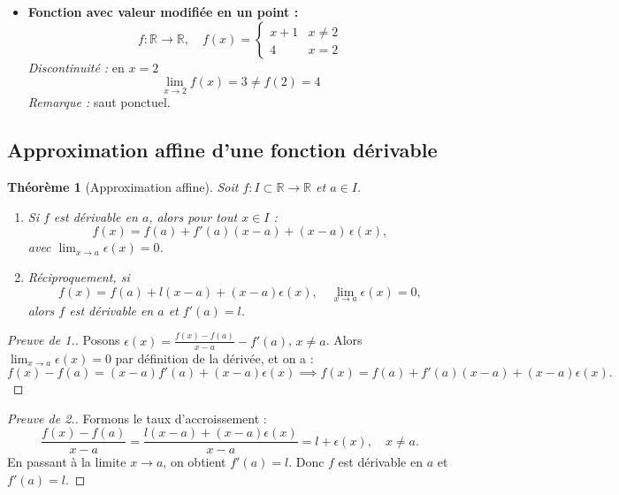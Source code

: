 \documentclass{report} %
\theoremstyle{definition}  %
\theoremstyle{plain} %
\newtheorem{theorem}{Théorème}[chapter]
\theoremstyle{remark} %
\begin{document}
\begin{itemize}
\begin{itemize}
        \item \textbf{Fonction avec valeur modifiée en un point :}  
        \[
        f : \mathbb{R} \to \mathbb{R}, \quad f(x) = 
        \begin{cases} 
            x+1 & x \neq 2 \\ 
            4 & x = 2 
        \end{cases}
        \]  
        \emph{Discontinuité :} en \(x=2\)  
        \[
        \lim_{x \to 2} f(x) = 3 \neq f(2) = 4
        \]  
        \emph{Remarque :} saut ponctuel.
    \end{itemize} %
\end{itemize} %




\subsection{Approximation affine d'une fonction dérivable}

\begin{theorem}[Approximation affine]
Soit \(f : I \subset \mathbb{R} \to \mathbb{R}\) et \(a \in I\).  

\begin{enumerate}
    \item Si \(f\) est dérivable en \(a\), alors pour tout \(x \in I\) :
    \[
    f(x) = f(a) + f'(a)(x-a) + (x-a)\,\epsilon(x),
    \]
    avec \(\lim_{x \to a} \epsilon(x) = 0\).

    \item Réciproquement, si
    \[
    f(x) = f(a) + l(x-a) + (x-a)\epsilon(x), \quad \lim_{x \to a} \epsilon(x) = 0,
    \]
    alors \(f\) est dérivable en \(a\) et \(f'(a) = l\).
\end{enumerate}
\end{theorem}

\begin{proof}[Preuve de 1.]
Posons \(\epsilon(x) = \frac{f(x)-f(a)}{x-a} - f'(a)\), \(x \neq a\).  
Alors \(\lim_{x \to a} \epsilon(x) = 0\) par définition de la dérivée, et on a :
\[
f(x)-f(a) = (x-a)f'(a) + (x-a)\epsilon(x) \implies f(x) = f(a) + f'(a)(x-a) + (x-a)\epsilon(x).
\]
\end{proof}

\begin{proof}[Preuve de 2.]
Formons le taux d'accroissement :
\[
\frac{f(x)-f(a)}{x-a} = \frac{l(x-a) + (x-a)\epsilon(x)}{x-a} = l + \epsilon(x), \quad x \neq a.
\]
En passant à la limite \(x \to a\), on obtient \(f'(a) = l\). Donc \(f\) est dérivable en \(a\) et \(f'(a)=l\).
\end{proof}
\end{document}
